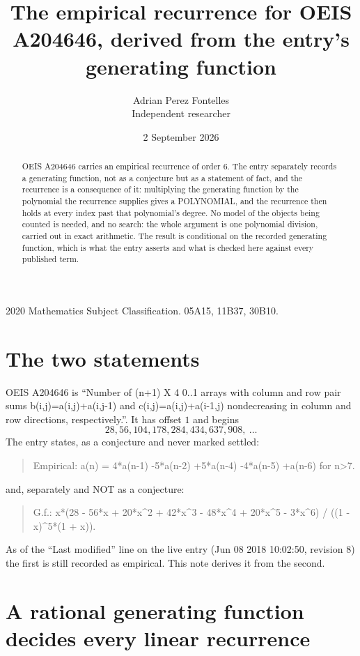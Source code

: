 \documentclass[11pt,a4paper]{article}
\title{The empirical recurrence for OEIS A204646, derived from the entry's generating function}
\author{Adrian Perez Fontelles\\ \small Independent researcher}
\date{2 September 2026}
\theoremstyle{plain}
\theoremstyle{definition}
\begin{document}
\maketitle

\begin{abstract}
OEIS A204646 carries an empirical recurrence of order $6$. The entry separately records a
generating function, not as a conjecture but as a statement of fact, and the recurrence is a
consequence of it: multiplying the generating function by the polynomial the recurrence
supplies gives a POLYNOMIAL, and the recurrence then holds at every index past that
polynomial's degree. No model of the objects being counted is needed, and no search: the
whole argument is one polynomial division, carried out in exact arithmetic. The result is
conditional on the recorded generating function, which is what the entry asserts and what is
checked here against every published term.
\end{abstract}

\noindent\small 2020 Mathematics Subject Classification. 05A15, 11B37, 30B10.\normalsize

\section{The two statements}

OEIS A204646 is ``Number of (n+1) X 4 0..1 arrays with column and row pair sums b(i,j)=a(i,j)+a(i,j-1) and c(i,j)=a(i,j)+a(i-1,j) nondecreasing in column and row directions, respectively.''. It has offset $1$ and begins
\[
28, 56, 104, 178, 284, 434, 637, 908,\ \dots
\]
The entry states, as a conjecture and never marked settled:
\begin{quote}
Empirical: a(n) = 4*a(n-1) -5*a(n-2) +5*a(n-4) -4*a(n-5) +a(n-6) for n>7.
\end{quote}
and, separately and NOT as a conjecture:
\begin{quote}
G.f.: x*(28 - 56*x + 20*x\^{}2 + 42*x\^{}3 - 48*x\^{}4 + 20*x\^{}5 - 3*x\^{}6) / ((1 - x)\^{}5*(1 + x)).
\end{quote}
As of the ``Last modified'' line on the live entry (Jun 08 2018 10:02:50, revision 8) the first is still
recorded as empirical. This note derives it from the second.

\section{A rational generating function decides every linear recurrence}
\end{document}
